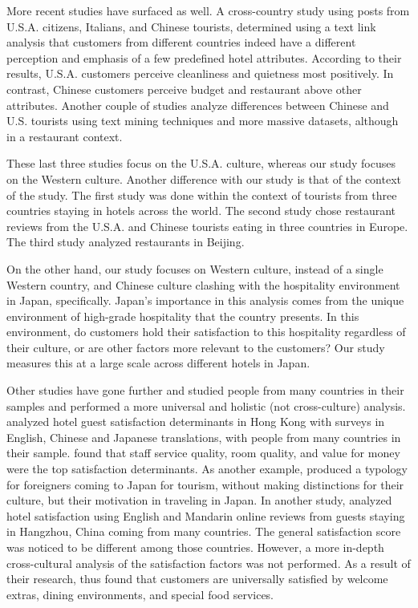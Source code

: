 \documentclass[smallextended,natbib]{svjour3}       %
\begin{document}
    More recent studies have surfaced as well. A cross-country study \cite[][]{FRANCESCO201924} using posts from U.S.A. citizens, Italians, and Chinese tourists, determined using a text link analysis that customers from different countries indeed have a different perception and emphasis of a few predefined hotel attributes. According to their results, U.S.A. customers perceive cleanliness and quietness most positively. In contrast, Chinese customers perceive budget and restaurant above other attributes. Another couple of studies \cite[][]{JIA2020104071, HUANG2017117} analyze differences between Chinese and U.S. tourists using text mining techniques and more massive datasets, although in a restaurant context. 

    These last three studies focus on the U.S.A. culture, whereas our study focuses on the Western culture. Another difference with our study is that of the context of the study. The first study \cite[][]{FRANCESCO201924} was done within the context of tourists from three countries staying in hotels across the world. The second study chose restaurant reviews from the U.S.A. and Chinese tourists eating in three countries in Europe. The third study analyzed restaurants in Beijing.

    On the other hand, our study focuses on Western culture, instead of a single Western country, and Chinese culture clashing with the hospitality environment in Japan, specifically. Japan's importance in this analysis comes from the unique environment of high-grade hospitality that the country presents. In this environment, do customers hold their satisfaction to this hospitality regardless of their culture, or are other factors more relevant to the customers? Our study measures this at a large scale across different hotels in Japan. 

    Other studies have gone further and studied people from many countries in their samples and performed a more universal and holistic (not cross-culture) analysis. \cite{choi2001} analyzed hotel guest satisfaction determinants in Hong Kong with surveys in English, Chinese and Japanese translations, with people from many countries in their sample. \cite{choi2001} found that staff service quality, room quality, and value for money were the top satisfaction determinants. As another example, \cite{Uzama2012} produced a typology for foreigners coming to Japan for tourism, without making distinctions for their culture, but their motivation in traveling in Japan. In another study, \cite{zhou2014} analyzed hotel satisfaction using English and Mandarin online reviews from guests staying in Hangzhou, China coming from many countries. The general satisfaction score was noticed to be different among those countries. However, a more in-depth cross-cultural analysis of the satisfaction factors was not performed. As a result of their research, \cite{zhou2014} thus found that customers are universally satisfied by welcome extras, dining environments, and special food services. 
\end{document}
